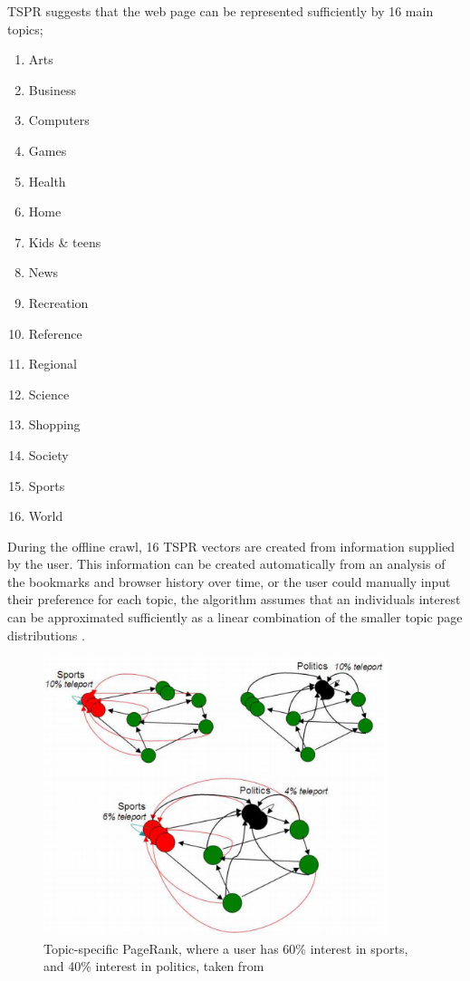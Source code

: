 \documentclass[11pt]{report}
\begin{document}
{TSPR suggests that the web page can be represented sufficiently by 16 main topics;
\begin{enumerate}
\item Arts
\item Business
\item Computers
\item Games
\item Health
\item Home
\item Kids \& teens
\item News
\item Recreation
\item Reference
\item Regional
\item Science
\item Shopping
\item Society
\item Sports
\item World
\end{enumerate} During the offline crawl, 16 TSPR vectors are created from information supplied by the user. This information can be created automatically from an analysis of the bookmarks and browser history over time, or the user could manually input their preference for each topic, the algorithm assumes that an individuals interest can be approximated sufficiently as a linear combination of the smaller topic page distributions \cite{manning}.
\begin{figure}[h!]
\centering
\includegraphics[width=10cm]{Topic-specific_PageRank_Manning.png}
\caption{Topic-specific PageRank, where a user has 60\% interest in sports, and 40\% interest in politics, taken from \cite{manning}}
\label{fig:topic-specific}
\end{figure}

}
\end{document}
